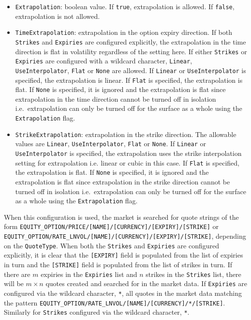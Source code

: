 \begin{itemize}
\item
\lstinline!Extrapolation!: boolean value. If \lstinline!true!, extrapolation is allowed. If \lstinline!false!, extrapolation is not allowed.

\item
\lstinline!TimeExtrapolation!: extrapolation in the option expiry direction. If both \lstinline!Strikes! and \lstinline!Expiries! are configured explicitly, the extrapolation in the time direction is flat in volatility regardless of the setting here. If either \lstinline!Strikes! or \lstinline!Expiries! are configured with a wildcard character, \lstinline!Linear!, \lstinline!UseInterpolator!, \lstinline!Flat! or \lstinline!None! are allowed. If \lstinline!Linear! or \lstinline!UseInterpolator! is specified, the extrapolation is linear. If \lstinline!Flat! is specified, the extrapolation is flat. If \lstinline!None! is specified, it is ignored and the extrapolation is flat since extrapolation in the time direction cannot be turned off in isolation i.e.\ extrapolation can only be turned off for the surface as a whole using the \lstinline!Extrapolation! flag.

\item
\lstinline!StrikeExtrapolation!: extrapolation in the strike direction. The allowable values are \lstinline!Linear!, \lstinline!UseInterpolator!, \lstinline!Flat! or \lstinline!None!. If \lstinline!Linear! or \lstinline!UseInterpolator! is specified, the extrapolation uses the strike interpolation setting for extrapolation i.e. linear or cubic in this case. If \lstinline!Flat! is specified, the extrapolation is flat. If \lstinline!None! is specified, it is ignored and the extrapolation is flat since extrapolation in the strike direction cannot be turned off in isolation i.e.\ extrapolation can only be turned off for the surface as a whole using the \lstinline!Extrapolation! flag.

\end{itemize}

When this configuration is used, the market is searched for quote strings of the form \lstinline!EQUITY_OPTION/PRICE/[NAME]/[CURRENCY]/[EXPIRY]/[STRIKE]! or \lstinline!EQUITY_OPTION/RATE_LNVOL/[NAME]/[CURRENCY]/[EXPIRY]/[STRIKE]!, depending on the \lstinline!QuoteType!. When both the \lstinline!Strikes! and \lstinline!Expiries! are configured explicitly, it is clear that the \lstinline![EXPIRY]! field is populated from the list of expiries in turn and the \lstinline![STRIKE]! field is populated from the list of strikes in turn. If there are $m$ expiries in the \lstinline!Expiries! list and $n$ strikes in the \lstinline!Strikes! list, there will be $m \times n$ quotes created and searched for in the market data. If \lstinline!Expiries! are configured via the wildcard character, \lstinline!*!, all quotes in the market data matching the pattern \lstinline!EQUITY_OPTION/RATE_LNVOL/[NAME]/[CURRENCY]/*/[STRIKE]!. Similarly for \lstinline!Strikes! configured via the wildcard character, \lstinline!*!.

